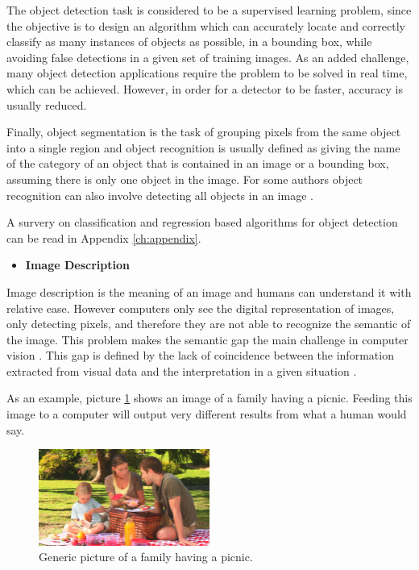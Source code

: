     \par The object detection task is considered to be a supervised learning problem, since the objective is to design an algorithm which can accurately locate and correctly classify as many instances of objects as possible, in a bounding box, while avoiding false detections in a given set of training images.  As an added challenge, many object detection applications require the problem to be solved in real time, which can be achieved. However, in order for a detector to be faster, accuracy is usually reduced. 

    \par Finally, object segmentation is the task of grouping pixels from the same object into a single region and object recognition is usually defined as giving the name of the category of an object that is contained in an image or a bounding box, assuming there is only one object in the image. For some authors object recognition can also involve detecting all objects in an image \cite{Agarwal2019}.

    A survery on classification and regression based algorithms for object detection can be read in Appendix \ref{ch:appendix}.

 

    \begin{itemize}
        \item \textbf{Image Description}
    \end{itemize}


    \par Image description is the meaning of an image and humans can understand it with relative ease. However computers only see the digital representation of images, only detecting pixels, and therefore they are not able to recognize the semantic of the image. This problem makes the semantic gap the main challenge in computer vision \cite{Huang2012}. This gap is defined by the lack of coincidence between the information extracted from visual data and the interpretation in a given situation \cite{Agarwal2019}.
    


    \par As an example, picture \ref{fig:picnic} shows an image of a family having a picnic. Feeding this image to a computer will output very different results from what a human would say.

    \begin{figure}[H]
        \centering
        \captionsetup{justification=centering}
        \includegraphics[width=0.5\textwidth]{Sections/2StateOfTheArt/2_images/picinic.png}
        \caption{Generic picture of a family having a picnic.}
        \label{fig:picnic}  
    \end{figure}


